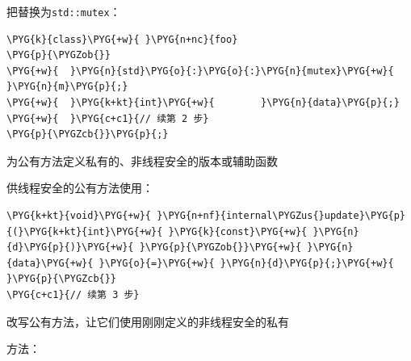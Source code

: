 
把替换为\texttt{std::\allowbreak{}mutex}：



\begin{codeblockbg}
\begin{Verbatim}[commandchars=\\\{\},breaklines=true,breakanywhere=true,fontsize=\codefont,xleftmargin=17bp]
\PYG{k}{class}\PYG{+w}{ }\PYG{n+nc}{foo}
\PYG{p}{\PYGZob{}}
\PYG{+w}{  }\PYG{n}{std}\PYG{o}{:}\PYG{o}{:}\PYG{n}{mutex}\PYG{+w}{ }\PYG{n}{m}\PYG{p}{;}
\PYG{+w}{  }\PYG{k+kt}{int}\PYG{+w}{        }\PYG{n}{data}\PYG{p}{;}
\PYG{+w}{  }\PYG{c+c1}{// 续第 2 步}
\PYG{p}{\PYGZcb{}}\PYG{p}{;}
\end{Verbatim}
\end{codeblockbg}



为公有方法定义私有的、非线程安全的版本或辅助函数



供线程安全的公有方法使用：



\begin{codeblockbg}
\begin{Verbatim}[commandchars=\\\{\},breaklines=true,breakanywhere=true,fontsize=\codefont,xleftmargin=17bp]
\PYG{k+kt}{void}\PYG{+w}{ }\PYG{n+nf}{internal\PYGZus{}update}\PYG{p}{(}\PYG{k+kt}{int}\PYG{+w}{ }\PYG{k}{const}\PYG{+w}{ }\PYG{n}{d}\PYG{p}{)}\PYG{+w}{ }\PYG{p}{\PYGZob{}}\PYG{+w}{ }\PYG{n}{data}\PYG{+w}{ }\PYG{o}{=}\PYG{+w}{ }\PYG{n}{d}\PYG{p}{;}\PYG{+w}{ }\PYG{p}{\PYGZcb{}}
\PYG{c+c1}{// 续第 3 步}
\end{Verbatim}
\end{codeblockbg}



改写公有方法，让它们使用刚刚定义的非线程安全的私有



方法：



